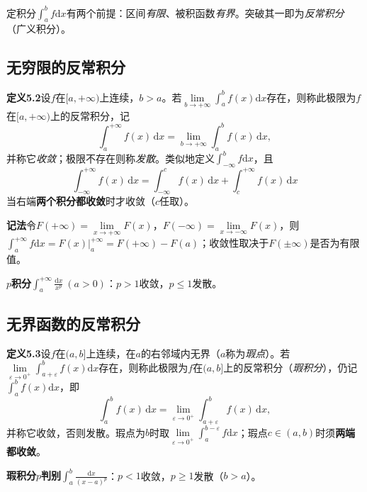 定积分$\int_a^bf\mathrm{d}x$有两个前提：区间\emph{有限}、被积函数\emph{有界}。突破其一即为\emph{反常积分}（广义积分）。

\subsection{无穷限的反常积分}

\noindent\textbf{定义5.2}\quad 设$f$在$[a,+\infty)$上连续，$b>a$。若$\lim\limits_{b\to+\infty}\displaystyle\int_a^bf(x)\mathrm{d}x$存在，则称此极限为$f$在$[a,+\infty)$上的反常积分，记
\[
\int_a^{+\infty}f(x)\,\mathrm{d}x=\lim_{b\to+\infty}\int_a^bf(x)\,\mathrm{d}x ,
\]
并称它\emph{收敛}；极限不存在则称\emph{发散}。类似地定义$\displaystyle\int_{-\infty}^bf\mathrm{d}x$，且
\[
\int_{-\infty}^{+\infty}f(x)\,\mathrm{d}x=\int_{-\infty}^{c}f(x)\,\mathrm{d}x+\int_c^{+\infty}f(x)\,\mathrm{d}x
\]
当右端\textbf{两个积分都收敛}时才收敛（$c$任取）。

\noindent\textbf{记法}\quad 令$F(+\infty)=\lim\limits_{x\to+\infty}F(x)$，$F(-\infty)=\lim\limits_{x\to-\infty}F(x)$，则$\displaystyle\int_a^{+\infty}f\mathrm{d}x=F(x)\big|_a^{+\infty}=F(+\infty)-F(a)$；收敛性取决于$F(\pm\infty)$是否为有限值。

\noindent\textbf{$p$积分}\quad $\displaystyle\int_a^{+\infty}\frac{\mathrm{d}x}{x^p}\ (a>0)$：$p>1$收敛，$p\le1$发散。


\subsection{无界函数的反常积分}

\noindent\textbf{定义5.3}\quad 设$f$在$(a,b]$上连续，在$a$的右邻域内无界（$a$称为\emph{瑕点}）。若$\lim\limits_{\varepsilon\to0^+}\displaystyle\int_{a+\varepsilon}^bf(x)\mathrm{d}x$存在，则称此极限为$f$在$(a,b]$上的反常积分（\emph{瑕积分}），仍记$\displaystyle\int_a^bf(x)\mathrm{d}x$，即
\[
\int_a^bf(x)\,\mathrm{d}x=\lim_{\varepsilon\to0^+}\int_{a+\varepsilon}^{b}f(x)\,\mathrm{d}x ,
\]
并称它收敛，否则发散。瑕点为$b$时取$\lim\limits_{\varepsilon\to0^+}\int_a^{b-\varepsilon}f\mathrm{d}x$；瑕点$c\in(a,b)$时须\textbf{两端都收敛}。

\noindent\textbf{瑕积分$p$判别}\quad $\displaystyle\int_a^b\frac{\mathrm{d}x}{(x-a)^p}$：$p<1$收敛，$p\ge1$发散（$b>a$）。

